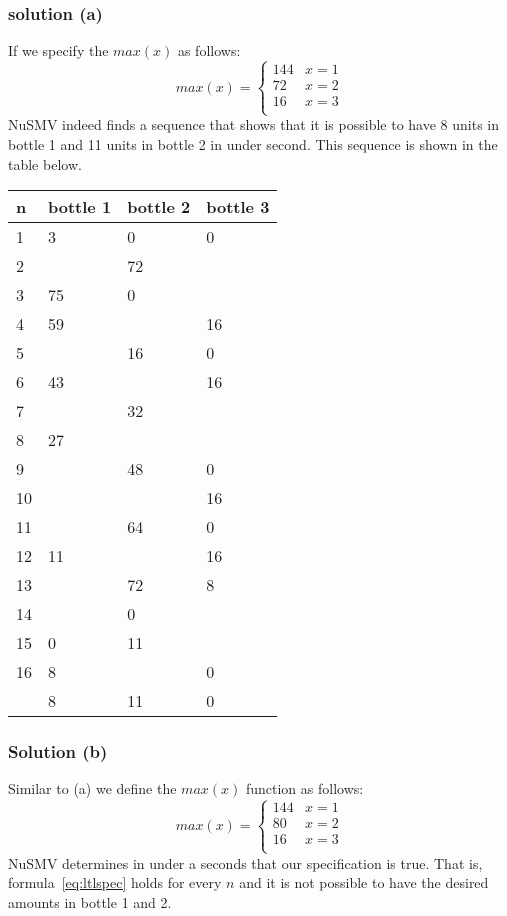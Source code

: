 \documentclass[12pt]{article}
\begin{document}
\subsubsection*{solution (a)}
If we specify the $max(x)$ as follows:
\begin{equation*}
max(x) = 
	\begin{cases}
		144 & x = 1\\  
		72 	& x = 2\\  
		16	& x = 3\\  
	\end{cases}
\end{equation*}
NuSMV indeed finds a sequence that shows that it is possible to have 8 units in 
bottle 1 and 11 units in bottle 2 in under second. This sequence is shown
in the table below.

\begin{tabular}{|l|l|l|l|}
	\hline	
	n & bottle 1	& bottle 2 	& bottle 3 	\\  
	\hline \hline
	1 & 3	& 0		& 0 \\  
	2 &  	& 72	&   \\  
	3 & 75  & 0		&   \\   	
	4 & 59	& 		& 16 \\  
	5 & 	& 16	& 0 \\  
	6 & 43 	&   	& 16 \\  
	7 & 	& 32	&   \\  
	8 & 27	& 		&   \\  
	9 & 	& 48	& 0 \\  
	10& 	& 		& 16 \\  
	11&     & 64	& 0 \\  
	12& 11	& 		& 16 \\  
	13&   	& 72	& 8 \\  
	14&  	& 0		&   \\  
	15& 0 	& 11	&   \\  
	16& 8	& 		& 0 \\  
	\hline
	  & 8	& 11	& 0 \\  
	\hline
\end{tabular}

\subsubsection*{Solution (b)}
Similar to (a) we define the $max(x)$ function as follows:
\begin{equation*}
max(x) = 
	\begin{cases}
		144 & x = 1\\  
		80 	& x = 2\\  
		16	& x = 3\\  
	\end{cases}
\end{equation*}
NuSMV determines in under a seconds that our specification is true. That is, 
formula~\ref{eq:ltlspec} holds for every $n$ and it is not possible to have the 
desired amounts in bottle 1 and 2.
\end{document}
